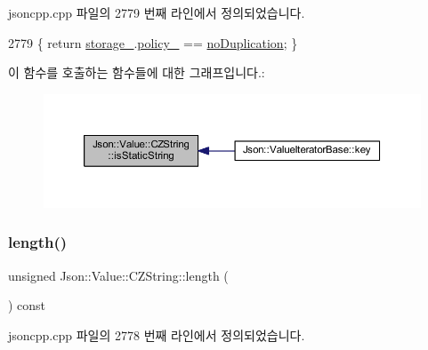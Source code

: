 jsoncpp.\+cpp 파일의 2779 번째 라인에서 정의되었습니다.


\begin{DoxyCode}
2779 \{ \textcolor{keywordflow}{return} \hyperlink{class_json_1_1_value_1_1_c_z_string_a17c92f0f089a4314e3b1d5695dc1a851}{storage\_}.\hyperlink{struct_json_1_1_value_1_1_c_z_string_1_1_string_storage_a7f68c8d6197c5692a525854b5f29f87b}{policy\_} == \hyperlink{class_json_1_1_value_1_1_c_z_string_a2805c46fb4a72bbaed55de6d75941b6da08d540450fa6c4af57eaacf063eedd20}{noDuplication}; \}
\end{DoxyCode}
이 함수를 호출하는 함수들에 대한 그래프입니다.\+:\nopagebreak
\begin{figure}[H]
\begin{center}
\leavevmode
\includegraphics[width=350pt]{class_json_1_1_value_1_1_c_z_string_a5991dfa2f6c2ba318373c7429fcd7a57_icgraph}
\end{center}
\end{figure}
\mbox{\label{class_json_1_1_value_1_1_c_z_string_aa7ee665d162c1f33b3ec818e289d8a5e}} 
\subsubsection{\texorpdfstring{length()}{length()}}
{\footnotesize\ttfamily unsigned Json\+::\+Value\+::\+C\+Z\+String\+::length (\begin{DoxyParamCaption}{ }\end{DoxyParamCaption}) const}



jsoncpp.\+cpp 파일의 2778 번째 라인에서 정의되었습니다.


